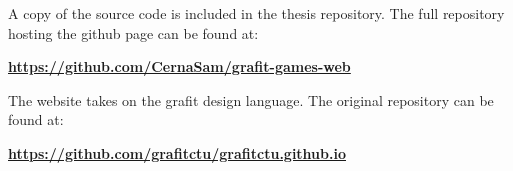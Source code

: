 A copy of the source code is included in the thesis repository.
The full repository hosting the github page can be found at:

\href{https://github.com/CernaSam/grafit-games-web}{\textbf{https://github.com/CernaSam/grafit-games-web}}

The website takes on the grafit design language. The original repository can be found at:

\href{https://github.com/grafitctu/grafitctu.github.io}{\textbf{https://github.com/grafitctu/grafitctu.github.io}}
